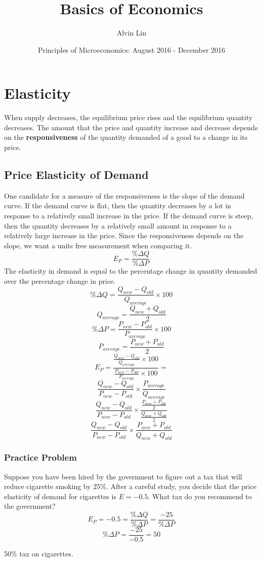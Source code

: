 \documentclass{article}
\title{Basics of Economics}
\author{Alvin Lin}
\date{Principles of Microeconomics: August 2016 - December 2016}
\begin{document}
\maketitle

\section{Elasticity}
When supply decreases, the equilibrium price rises and the equilibrium
quantity decreases. The amount that the price and quantity increase and
decrease depends on the \textbf{responsiveness} of the quantity demanded of
a good to a change in its price.

\subsection{Price Elasticity of Demand}
One candidate for a measure of the responsiveness is the slope of the demand
curve. If the demand curve is flat, then the quantity decreases by a lot in
response to a relatively small increase in the price. If the demand curve is
steep, then the quantity decreases by a relatively small amount in response to
a relatively large increase in the price. Since the responsiveness depends on
the slope, we want a units free measurement when comparing it.
\[ E_{P} = \frac{\%\Delta Q}{\%\Delta P} \]
The elasticity in demand is equal to the percentage change in quantity demanded
over the percentage change in price.
\[ \%\Delta Q = \frac{Q_{new}-Q_{old}}{Q_{average}}\times 100 \]
\[ Q_{average} = \frac{Q_{new}+Q_{old}}{2} \]
\[ \%\Delta P = \frac{P_{new}-P_{old}}{P_{average}}\times 100 \]
\[ P_{average} = \frac{P_{new}+P_{old}}{2} \]
\[ E_{P} = \frac{\frac{Q_{new}-Q_{old}}{Q_{average}}\times 100}
            {\frac{P_{new}-P_{old}}{P_{average}}\times 100} = \]
\[ \frac{Q_{new}-Q_{old}}{P_{new}-P_{old}}\times
   \frac{P_{average}}{Q_{average}} \]
\[ \frac{Q_{new}-Q_{old}}{P_{new}-P_{old}}\times
   \frac{\frac{P_{new}+P_{old}}{2}}{\frac{Q_{new}+Q_{old}}{2}} \]
\[ \frac{Q_{new}-Q_{old}}{P_{new}-P_{old}}\times
   \frac{P_{new}+P_{old}}{Q_{new}+Q_{old}} \]

\subsubsection{Practice Problem}
Suppose you have been hired by the government to figure out a tax that will
reduce cigarette smoking by \( 25\% \). After a careful study, you decide
that the price elasticity of demand for cigarettes is \( E = -0.5 \). What
tax do you recommend to the government?
\[ E_{P} = -0.5 = \frac{\%\Delta Q}{\%\Delta P} = \frac{-25}{\%\Delta P} \]
\[ \%\Delta P = \frac{-25}{-0.5} = 50 \]
\begin{center}
  50\% tax on cigarettes.
\end{center}
\end{document}
